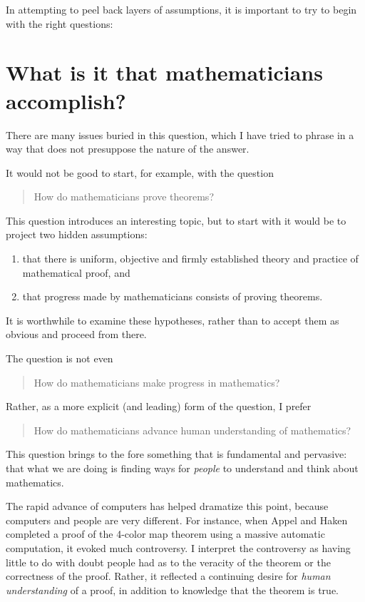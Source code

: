 \bigskip

In attempting to peel back layers of assumptions, it is 
important to
try to begin with the right questions:

\section{What is it that mathematicians accomplish?}

There are many issues buried in this question, which I 
have tried to phrase in
a way that does not presuppose the nature of the answer.

It would not be good to start, for example, with the 
question
\begin{quotation}
How do mathematicians prove theorems?
\end{quotation}  
This question introduces an interesting topic, but 
to start with it would be to project two hidden assumptions:
\begin{enumerate}  
\item that there is uniform, objective and firmly 
established theory and practice of mathematical proof, and
\item that progress made by mathematicians consists of 
proving 
theorems. \end{enumerate}
It is worthwhile to examine these hypotheses, rather than 
to accept
them as obvious and proceed from there.

The question is not even
\begin{quote}
How do mathematicians make progress in mathematics?
\end{quote} 
Rather, as a more explicit (and leading) form of the 
question, I prefer
\begin{quote}
How do mathematicians advance human understanding of 
mathematics?
\end{quote}

This question brings to the fore something that is
fundamental and pervasive: that what we are doing is finding
ways for {\it people} to understand and think about 
mathematics.

The rapid advance of computers has helped 
dramatize this point, because computers and people are 
very different.
For instance, when Appel and Haken completed a proof of 
the 4-color 
map theorem using a massive automatic computation, it 
evoked much controversy.
I interpret the controversy as having
little to do with doubt people had as to the veracity 
of the theorem or the correctness of the proof.  Rather, 
it reflected a 
continuing desire for {\it human understanding} of a 
proof, in addition
to knowledge that the theorem is true.

